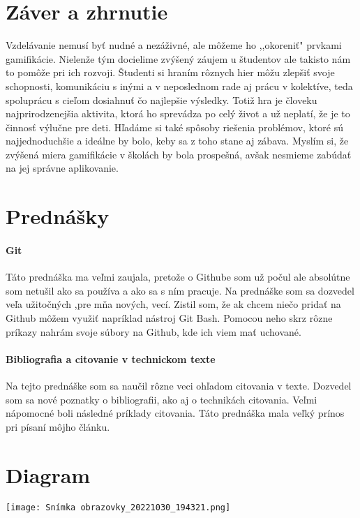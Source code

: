 \documentclass[10pt,twoside,slovak,a4paper]{article}
\begin{document}
\section{Záver a zhrnutie} \label{zaver} %
Vzdelávanie nemusí byť nudné a nezáživné, ale môžeme ho ,,okoreniť" prvkami gamifikácie. Nielenže tým docielime zvýšený záujem u študentov ale takisto nám to pomôže pri ich rozvoji. Študenti si hraním rôznych hier môžu zlepšiť svoje schopnosti, komunikáciu s inými a v neposlednom rade aj prácu v kolektíve, teda spoluprácu s cieľom dosiahnuť čo najlepšie výsledky. Totiž hra je človeku najprirodzenejšia aktivita, ktorá ho sprevádza po celý život a už neplatí, že je to činnosť výlučne pre deti. Hľadáme si také spôsoby riešenia problémov, ktoré sú najjednoduchšie a ideálne by bolo, keby sa z toho stane aj zábava.\cite{jakub} Myslím si, že zvýšená miera gamifikácie v školách by bola prospešná, avšak nesmieme zabúdať na jej správne aplikovanie.

\section{Prednášky}
\paragraph{Git}
Táto prednáška ma veľmi zaujala, pretože o Githube som už počul ale absolútne som netušil ako sa používa a ako sa s ním pracuje. Na prednáške som sa dozvedel veľa užitočných ,pre mňa nových, vecí. Zistil som, že ak chcem niečo pridať na Github môžem využiť napríklad nástroj Git Bash. Pomocou neho skrz rôzne príkazy nahrám svoje súbory na Github, kde ich viem mať uchované.
\paragraph{Bibliografia a citovanie v technickom texte}
Na tejto prednáške som sa naučil rôzne veci ohľadom citovania v texte. Dozvedel som sa nové poznatky o bibliografii, ako aj o technikách citovania. Veľmi nápomocné boli následné príklady citovania. Táto prednáška mala veľký prínos pri písaní môjho článku.

\section{Diagram}
\texttt{[image: Snímka obrazovky\_20221030\_194321.png]}




\end{document}
